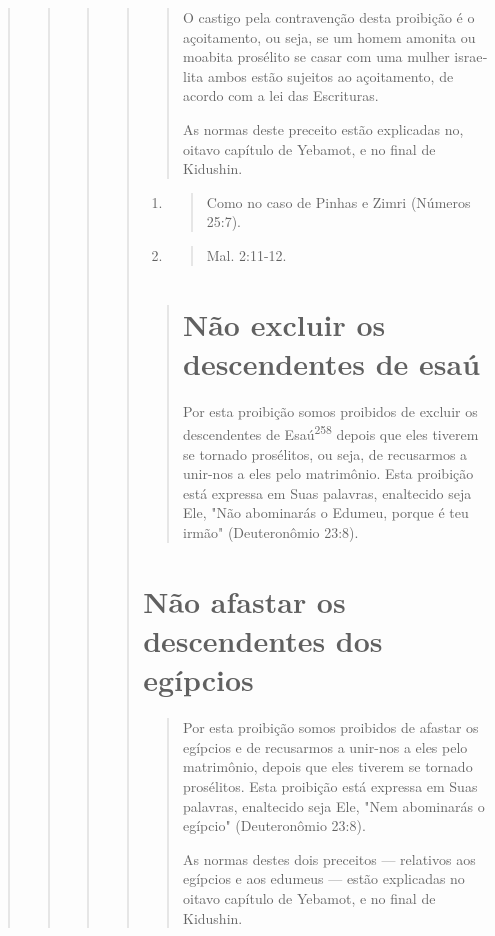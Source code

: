 \begin{quote}
\begin{quote}
\begin{quote}
\begin{quote}
\begin{quote}
O castigo pela contravenção desta proibição é o açoitamento, ou se­ja,
se um homem amonita ou moabita prosélito se casar com uma mulher
israe­lita ambos estão sujeitos ao açoitamento, de acordo com a lei das
Escrituras.

As normas deste preceito estão explicadas no, oitavo capítulo de
Ye­bamot, e no final de Kidushin.
\end{quote}

\begin{enumerate}
\def\labelenumi{\arabic{enumi}.}
\setcounter{enumi}{255}
\item
 \begin{quote}
 Como no caso de Pinhas e Zimri (Números 25:7).
 \end{quote}
\item
 \begin{quote}
 Mal. 2:11-12.
 \end{quote}
\end{enumerate}

\begin{quote}

\section{Não excluir os descendentes de esaú}

Por esta proibição somos proibidos de excluir os descendentes de
Esaú\textsuperscript{258} depois que eles tiverem se tornado prosélitos,
ou seja, de recusarmos a unir-nos a eles pelo matrimônio. Esta proibição
está expressa em Suas pala­vras, enaltecido seja Ele, "Não abominarás o
Edumeu, porque é teu irmão" (Deu­teronômio 23:8).
\end{quote}

\section{Não afastar os descendentes dos egípcios}

\begin{quote}
Por esta proibição somos proibidos de afastar os egípcios e de
recu­sarmos a unir-nos a eles pelo matrimônio, depois que eles tiverem
se tornado prosélitos. Esta proibição está expressa em Suas palavras,
enaltecido seja Ele, "Nem abominarás o egípcio" (Deuteronômio 23:8).

As normas destes dois preceitos --- relativos aos egípcios e aos
edu­meus --- estão explicadas no oitavo capítulo de Yebamot, e no final
de Kidushin.


\end{quote}
\end{quote}
\end{quote}
\end{quote}
\end{quote}
